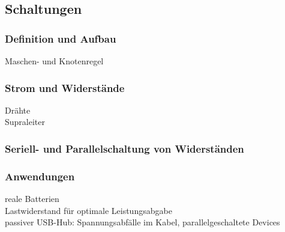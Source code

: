 \subsection{Schaltungen}

\subsubsection{Definition und Aufbau}
Maschen- und Knotenregel

\subsubsection{Strom und Widerstände}
Drähte\\
Supraleiter

\subsubsection{Seriell- und Parallelschaltung von Widerständen}

\subsubsection{Anwendungen}
reale Batterien\\
Lastwiderstand für optimale Leistungsabgabe\\
passiver USB-Hub: Spannungsabfälle im Kabel, parallelgeschaltete Devices